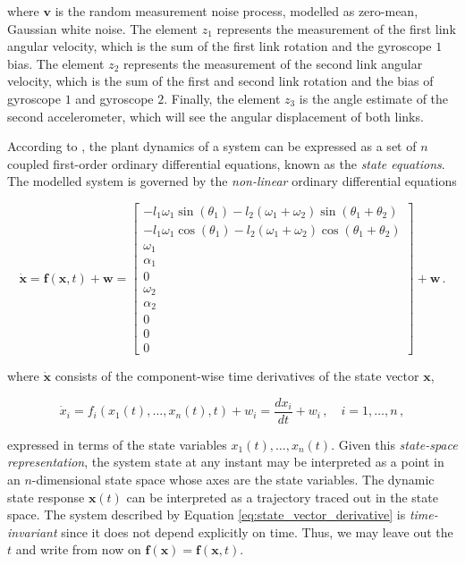\noindent
where $\mathbf{v}$ is the random measurement noise process, modelled as zero-mean, Gaussian white noise. The element $z_1$ represents the measurement of the first link angular velocity, which is the sum of the first link rotation and the gyroscope $1$ bias. The element $z_2$ represents the measurement of the second link angular velocity, which is the sum of the first and second link rotation and the bias of gyroscope $1$ and gyroscope $2$. Finally, the element $z_3$ is the angle estimate of the second accelerometer, which will see the angular displacement of both links.

According to  \citeauthor{rowell2002state} \cite{rowell2002state}, the plant dynamics of a system can be expressed as a set of $n$ coupled first-order ordinary differential equations, known as the \emph{state equations}. The modelled system is governed by the \emph{non-linear} ordinary differential equations

\begin{equation} \label{eq:state_vector_derivative}
  \dot{\mathbf{x}} = \mathbf{f}(\mathbf{x}, t) + \mathbf{w} = \left[\begin{smallmatrix}
  -l_1 \omega_1 \sin(\theta_1)  - l_2 (\omega_1 + \omega_2) \sin(\theta_1 + \theta_2) \\
  -l_1 \omega_1 \cos(\theta_1)  - l_2 (\omega_1 + \omega_2) \cos(\theta_1 + \theta_2) \\ \omega_1 \\ \alpha_1 \\ 0 \\ \omega_2 \\ \alpha_2 \\ 0 \\ 0 \\ 0
  \end{smallmatrix}\right] + \mathbf{w}\,.
\end{equation}

\noindent
where $\dot{\mathbf{x}}$ consists of the component-wise time derivatives of the state vector $\mathbf{x}$, 

\begin{equation}
  \dot{x}_i = f_i(x_1(t), \dots, x_n(t), t) + w_i = \frac{dx_i}{dt} + w_i\,, \quad i = 1, \dots, n\,,
\end{equation}

\noindent
expressed in terms of the state variables $x_1(t), \dots, x_n(t)$. Given this \emph{state-space representation}, the system state at any instant may be interpreted as a point in an $n$-dimensional state space whose axes are the state variables. The dynamic state response $\mathbf{x}(t)$ can be interpreted as a trajectory traced out in the state space. The system described by Equation \ref{eq:state_vector_derivative} is \emph{time-invariant} since it does not depend explicitly on time. Thus, we may leave out the $t$ and write from now on $\mathbf{f}(\mathbf{x}) = \mathbf{f}(\mathbf{x}, t)$.

